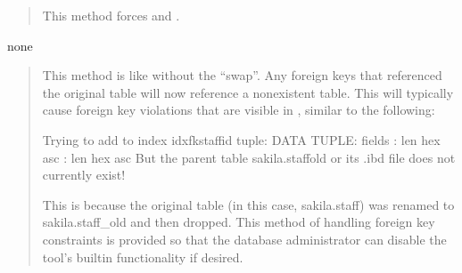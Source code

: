 \documentclass[letterpaper,10pt,english]{sphinxmanual}
\begin{document}
\begin{fulllineitems}
\begin{quote}
\sphinxAtStartPar
This method forces  and .
\end{quote}

\sphinxAtStartPar
none
\begin{quote}

\sphinxAtStartPar
This method is like  without the “swap”.  Any foreign keys that
referenced the original table will now reference a nonexistent table. This will
typically cause foreign key violations that are visible in , similar to the following:

\begin{sphinxVerbatim}[commandchars=\\\{\}]
Trying to add to index idx\PYGZus{}fk\PYGZus{}staff\PYGZus{}id tuple:
DATA TUPLE:  fields
: len  hex  asc  
: len  hex  asc     
But the parent table sakila.staff\PYGZus{}old
or its .ibd file does not currently exist!
\end{sphinxVerbatim}

\sphinxAtStartPar
This is because the original table (in this case, sakila.staff) was renamed to
sakila.staff\_old and then dropped. This method of handling foreign key
constraints is provided so that the database administrator can disable the
tool’s built\sphinxhyphen{}in functionality if desired.
\end{quote}

\end{fulllineitems}

\end{document}
